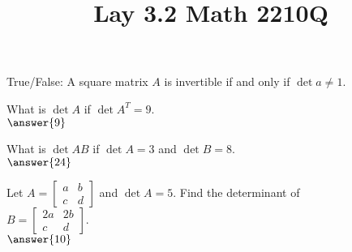 \documentclass{ximera}
\begin{document}
  	\title{Lay 3.2  \hfill Math 2210Q} 

  \begin{question} True/False: A square matrix $A$ is invertible if and only if $\det a \neq 1$.\\
  	
  	\begin{multipleChoice}
  		\end{multipleChoice}
  	
  	\end{question}	
   \begin{question} What is $\det A$ if $\det A^T = 9$.\\
   	
   $	\answer{9}$
   	
   \end{question}	
   \begin{question} What is $\det AB$ if $\det A = 3$ and $\det B = 8$.\\
   	
   $	\answer{24}$
   	
   \end{question}	
   
   \begin{question} Let $A = \begin{bmatrix} a & b\\ c&d\end{bmatrix}$ and $\det A = 5$. Find the determinant of \\ $B = \begin{bmatrix} 2a & 2b\\ c&d\end{bmatrix}$.\\
   	
   $	\answer{10}$
   	
   \end{question}	
   
\end{document}
